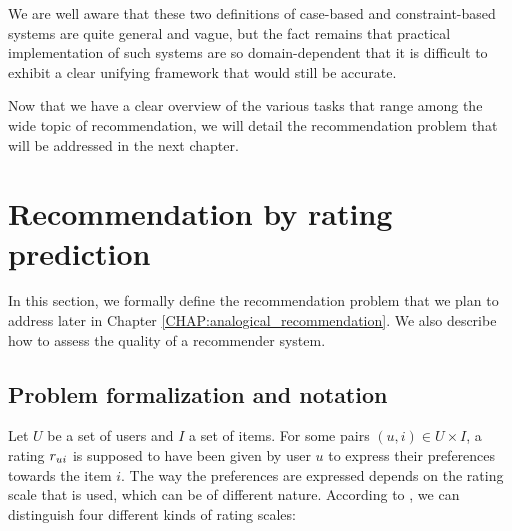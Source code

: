 We are well aware that these two definitions of case-based and constraint-based
systems are quite general and vague, but the fact remains that practical
implementation of such systems are so domain-dependent that it is difficult to
exhibit a clear unifying framework that would still be accurate.

Now that we have a clear overview of the various tasks that range among the
wide topic of recommendation, we will detail the recommendation problem that
will be addressed in the next chapter.

\section{Recommendation by rating prediction}
\label{SEC:recommendation_rating_prediction}

In this section, we formally define the recommendation problem that we plan to
address later in Chapter \ref{CHAP:analogical_recommendation}. We also describe
how to assess the quality of a recommender system.

\subsection{Problem formalization and notation}
Let $U$ be a set of users and $I$ a set of items. For some pairs $(u,i) \in U
\times I$, a rating  $r_{ui}$ is supposed to have been given by user $u$ to express
their preferences towards the item $i$. The way the preferences are expressed
depends on the rating scale that is used, which can be of different nature.
According to \cite{SchFraHerSen07}, we can distinguish four different kinds of
rating scales:

